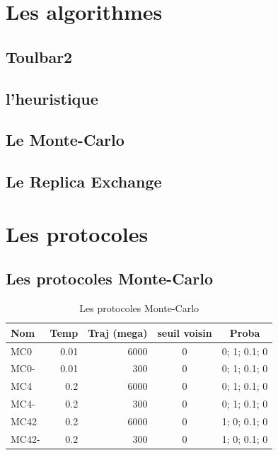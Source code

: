 \documentclass[a4paper,12pt]{article}
\begin{document}
\listoffigures

   \section{Les algorithmes} 

   \subsection{Toulbar2} 
   \subsection{l'heuristique} 
   \subsection{Le Monte-Carlo}
   \subsection{Le Replica Exchange}
 
   \section{Les protocoles} 



   \subsection{Les protocoles Monte-Carlo} 
    
    \begin{table}[!htbp]
      \centering

      \begin{tabular}{|l|r|r|c|c|}

        \hline
        Nom & Temp & Traj (mega)& seuil voisin  & Proba \\
        \hline
        MC0   & 0.01  &  6000 & 0 & 0; 1; 0.1; 0   \\  
        MC0-  & 0.01  &   300 & 0 & 0; 1; 0.1; 0   \\  
        MC4   & 0.2   &  6000 & 0 & 0; 1; 0.1; 0   \\          
        MC4-  & 0.2   &   300 & 0 & 0; 1; 0.1; 0   \\ 
        MC42  & 0.2   &  6000 & 0 & 1; 0; 0.1; 0   \\        
        MC42- & 0.2   &   300 & 0 & 1; 0; 0.1; 0   \\   \hline                   

       
      \end{tabular}      
      \caption{Les protocoles Monte-Carlo}
      \label{tab_protoMC}      
    \end{table}
\end{document}
